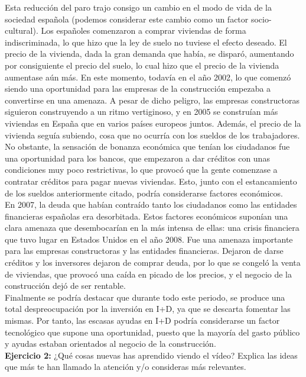 \documentclass[11pt]{article}
\theoremstyle{plain}
\theoremstyle{definition}
\begin{document}
Esta reducción del paro trajo consigo un cambio en el modo de vida de
la sociedad española (podemos considerar este cambio como un factor
socio-cultural). Los españoles comenzaron a comprar viviendas de forma
indiscriminada, lo que hizo que la ley de suelo no tuviese el efecto
deseado. El precio de la vivienda, dada la gran demanda que había, se
disparó, aumentando por consiguiente el precio del suelo, lo cual hizo
que el precio de la vivienda aumentase aún más. En este momento,
todavía en el año 2002, lo que comenzó siendo una oportunidad para las
empresas de la construcción empezaba a convertirse en una amenaza. A
pesar de dicho peligro, las empresas constructoras siguieron
construyendo a un ritmo vertiginoso, y en 2005 se construían más
viviendas en España que en varios países europeos juntos. Además, el
precio de la vivienda seguía subiendo, cosa que no ocurría con los
sueldos de los trabajadores. No obstante, la sensación de bonanza
económica que tenían los ciudadanos fue una oportunidad para los
bancos, que empezaron a dar créditos con unas condiciones muy poco
restrictivas, lo que provocó que la gente comenzase a contratar
créditos para pagar nuevas viviendas. Esto, junto con el estancamiento
de los sueldos anteriormente citado, podría considerarse factores
económicos. \\

En 2007, la deuda que habían contraído tanto los ciudadanos como las
entidades financieras españolas era desorbitada. Estos factores
económicos suponían una clara amenaza que desembocarían en la más
intensa de ellas: una crisis financiera que tuvo lugar en Estados
Unidos en el año 2008. Fue una amenaza importante para las empresas
constructoras y las entidades financieras. Dejaron de darse créditos y
los inversores dejaron de comprar deuda, por lo que se congeló la
venta de viviendas, que provocó una caída en picado de los precios, y
el negocio de la construcción dejó de ser rentable.\\

Finalmente se podría destacar que durante todo este periodo, se
produce una total despreocupación por la inversión en I+D, ya que se
descarta fomentar las mismas. Por tanto, las escasas ayudas en I+D
podría considerarse un factor tecnológico que supone una oportunidad,
puesto que la mayoría del gasto público y ayudas estaban orientados
al negocio de la construcción.\\

\textbf{Ejercicio 2:} ¿Qué cosas nuevas has aprendido viendo el vídeo?
Explica las ideas que más te han llamado la atención y/o consideras
más relevantes.\\
\end{document}
